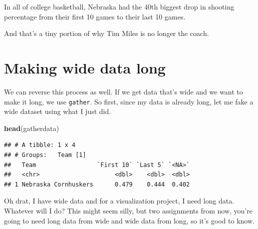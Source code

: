 \documentclass[]{book}
\newenvironment{Shaded}{\begin{snugshade}}{\end{snugshade}}
\newcommand{\KeywordTok}[1]{\textcolor[rgb]{0.13,0.29,0.53}{\textbf{#1}}}
\newcommand{\DataTypeTok}[1]{\textcolor[rgb]{0.13,0.29,0.53}{#1}}
\newcommand{\DecValTok}[1]{\textcolor[rgb]{0.00,0.00,0.81}{#1}}
\newcommand{\StringTok}[1]{\textcolor[rgb]{0.31,0.60,0.02}{#1}}
\newcommand{\OperatorTok}[1]{\textcolor[rgb]{0.81,0.36,0.00}{\textbf{#1}}}
\newcommand{\NormalTok}[1]{#1}
\begin{document}
In all of college basketball, Nebraska had the 40th biggest drop in
shooting percentage from their first 10 games to their last 10 games.

And that's a tiny portion of why Tim Miles is no longer the coach.

\section{Making wide data long}\label{making-wide-data-long}

We can reverse this process as well. If we get data that's wide and we
want to make it long, we use \texttt{gather}. So first, since my data is
already long, let me fake a wide dataset using what I just did.

\begin{Shaded}
\end{Shaded}

\begin{Shaded}
\begin{Highlighting}[]
\KeywordTok{head}\NormalTok{(gatherdata)}
\end{Highlighting}
\end{Shaded}

\begin{verbatim}
## # A tibble: 1 x 4
## # Groups:   Team [1]
##   Team                 `First 10` `Last 5` `<NA>`
##   <chr>                     <dbl>    <dbl>  <dbl>
## 1 Nebraska Cornhuskers      0.479    0.444  0.402
\end{verbatim}

Oh drat, I have wide data and for a visualization project, I need long
data. Whatever will I do? This might seem silly, but two assignments
from now, you're going to need long data from wide and wide data from
long, so it's good to know.
\end{document}
